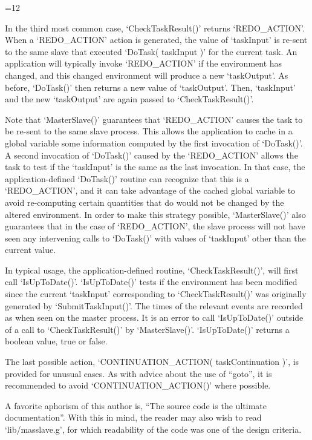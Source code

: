 {=12
\par}

In the third most common case,
`CheckTaskResult()' returns
`REDO_ACTION'.  When a
`REDO_ACTION' action is generated, the value of `taskInput' is
re-sent to the same slave that executed
`DoTask( taskInput )' for
the current task.  An application will typically invoke
`REDO_ACTION' if the environment has changed, and this changed
environment will produce a new `taskOutput'.  As before,
`DoTask()' then returns a new value of
`taskOutput'.  Then, `taskInput' and the new `taskOutput'
are again passed to
`CheckTaskResult()'.

Note that `MasterSlave()' guarantees that `REDO_ACTION'
causes the task to be re-sent to the same slave process.  This allows
the application to cache in a global variable some information
computed by the first invocation of `DoTask()'.  A second invocation of
`DoTask()' caused by the
`REDO_ACTION' allows the task to test if the `taskInput'
is the same as
the last invocation.  In that case, the application-defined `DoTask()'
routine can recognize that this is a `REDO_ACTION', and it can take
advantage of the cached global variable to avoid re-computing certain
quantities that do would not be changed by the altered environment.
In order to make this strategy possible, `MasterSlave()' also guarantees
that in the case of `REDO_ACTION', the slave process will not have
seen any intervening calls to `DoTask()' with values of
`taskInput' other than the current value.

In typical usage, the application-defined routine,
`CheckTaskResult()', will first call `IsUpToDate()'.
`IsUpToDate()' tests if the environment has been
modified since the current `taskInput' corresponding to
`CheckTaskResult()'
was originally generated by `SubmitTaskInput()'.  The times of the relevant
events are recorded as when seen on the master process.  It is an
error to call `IsUpToDate()' outside of a call to
`CheckTaskResult()' by `MasterSlave()'.
`IsUpToDate()' returns a boolean value, true or false.

The last possible action,
`CONTINUATION_ACTION( taskContinuation )', is provided for
unusual cases.  As with advice about the use of
``goto'', it is recommended to avoid `CONTINUATION_ACTION()'
where possible.  

A favorite aphorism of this author is, ``The source
code is the ultimate documentation''.  With this in mind, the reader
may also wish to read `lib/masslave.g', for which readability of the
code was one of the design criteria.

